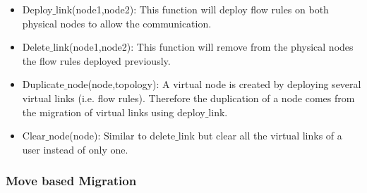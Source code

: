 \begin{itemize}
\item Deploy$\_$link(node1,node2): This function will deploy flow rules on both physical nodes to allow the communication.
\item Delete$\_$link(node1,node2): This function will remove from the physical nodes the flow rules deployed previously.
\item Duplicate$\_$node(node,topology): A virtual node is created by deploying several virtual links (i.e. flow rules). Therefore the duplication of a node comes from the migration of virtual links using deploy$\_$link.  
\item Clear$\_$node(node): Similar to delete$\_$link but clear all the virtual links of a user instead of only one.
\end{itemize}

\subsubsection{Move based Migration}
\label{sec:move-algo}


